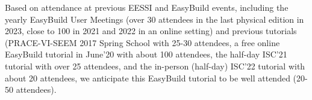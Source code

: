 
Based on attendance at previous EESSI and EasyBuild events, including the yearly EasyBuild User Meetings (over 30 attendees in the last physical edition in 2023,
close to 100 in 2021 and 2022 in an online setting) and previous tutorials (PRACE-VI-SEEM
2017 Spring School with 25-30 attendees, a free online EasyBuild
tutorial in June'20 with about 100 attendees, the half-day ISC'21 tutorial with over 25 attendees, and the in-person (half-day) ISC'22 tutorial with about 20 attendees, we anticipate this EasyBuild tutorial to be well attended (20-50 attendees).




